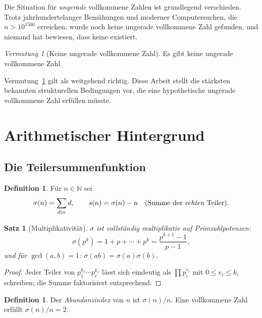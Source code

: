 \documentclass[12pt,a4paper]{amsart}
\newtheorem{satz}[theorem]{Satz}
\theoremstyle{definition}
\newtheorem{definition_de}[theorem]{Definition}
\theoremstyle{remark}
\newtheorem{vermutung}[theorem]{Vermutung}
\newcommand{\N}{\mathbb{N}}
\begin{document}
Die Situation für \emph{ungerade} vollkommene Zahlen ist grundlegend verschieden.
Trotz jahrhundertelanger Bemühungen und moderner Computersuchen, die
$n > 10^{1500}$ erreichen, wurde noch keine ungerade vollkommene Zahl gefunden,
und niemand hat bewiesen, dass keine existiert.

\begin{vermutung}[Keine ungerade vollkommene Zahl]
\label{verm:keine}
Es gibt keine ungerade vollkommene Zahl.
\end{vermutung}

Vermutung~\ref{verm:keine} gilt als weitgehend richtig.
Diese Arbeit stellt die stärksten bekannten strukturellen Bedingungen vor,
die eine hypothetische ungerade vollkommene Zahl erfüllen müsste.

\section{Arithmetischer Hintergrund}

\subsection{Die Teilersummenfunktion}

\begin{definition_de}
Für $n \in \N$ sei
\[
  \sigma(n) = \sum_{d \mid n} d, \qquad
  s(n) = \sigma(n) - n \quad \text{(Summe der \emph{echten} Teiler)}.
\]
\end{definition_de}

\begin{satz}[Multiplikativität]
$\sigma$ ist vollständig multiplikativ auf Primzahlpotenzen:
\[
  \sigma(p^k) = 1 + p + \cdots + p^k = \frac{p^{k+1}-1}{p-1},
\]
und für $\gcd(a,b)=1$: $\sigma(ab) = \sigma(a)\sigma(b)$.
\end{satz}

\begin{proof}
Jeder Teiler von $p_1^{k_1}\cdots p_r^{k_r}$ lässt sich eindeutig als
$\prod p_i^{e_i}$ mit $0 \leq e_i \leq k_i$ schreiben; die Summe
faktorisiert entsprechend.
\end{proof}

\begin{definition_de}
Der \emph{Abundanzindex} von $n$ ist $\sigma(n)/n$.
Eine vollkommene Zahl erfüllt $\sigma(n)/n = 2$.
\end{definition_de}
\end{document}
